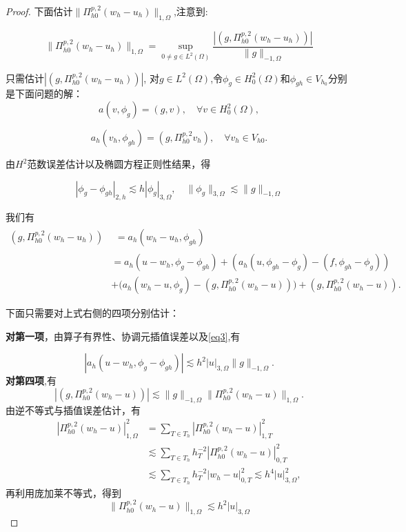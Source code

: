 \documentclass[12pt,a4paper]{article}
\begin{document}
\begin{enumerate}
\begin{proof}
			
			
			下面估计$\|\Pi_{h0}^{p,2}(w_h-u_h)\|_{1,\Omega}$,注意到:
			
			\begin{equation}\label{eq2}
				\|\Pi_{h0}^{p,2}(w_h-u_h)\|_{1,\Omega}=\sup_{0\neq g\in L^2(\Omega)}\frac{|(g,\Pi_{h0}^{p,2}(w_h-u_h))|}{\|g\|_{-1,\Omega}}
			\end{equation}
			
			
			只需估计$|(g,\Pi_{h0}^{p,2}(w_h-u_h))|$, 对$g\in L^2(\Omega)$,令$\phi_g\in H_0^2(\Omega)$和$\phi_{gh}\in V_{h_0}$分别是下面问题的解：
			$$a(v,\phi_g)=(g,v),\quad\forall v\in H_0^2(\Omega),$$
			
			$$a_h(v_h,\phi_{gh})=(g,\Pi_{h0}^{p,2}v_h),\quad\forall v_h\in V_{h0}.$$
			
			
			由$H^2$范数误差估计以及椭圆方程正则性结果，得
			
			\begin{equation}\label{eq3}
				|\phi_g-\phi_{gh}|_{2,h}\lesssim h|\phi_g|_{3,\Omega},\quad\|\phi_g\|_{3,\Omega}\lesssim\|g\|_{-1,\Omega}
			\end{equation}
			
			
			我们有
			$$
			\begin{aligned}
				(g,\Pi_{h0}^{p,2}(w_h-u_h))& \begin{aligned}=a_h(w_h-u_h,\phi_{gh})\end{aligned}  \\
				&=a_h(u-w_h,\phi_g-\phi_{gh})+\left(a_h(u,\phi_{gh}-\phi_g)-(f,\phi_{gh}-\phi_g)\right) \\
				&+\Big(a_h(w_h-u,\phi_g)-(g,\Pi_{h0}^{p,2}(w_h-u))\Big)+(g,\Pi_{h0}^{p,2}(w_h-u)).
			\end{aligned}
			$$
			
			下面只需要对上式右侧的四项分别估计：
			
			\textbf{对第一项}，由算子有界性、协调元插值误差以及\eqref{eq3},有
			
			\begin{equation}\label{eq4}
				|a_h(u-w_h,\phi_g-\phi_{gh})|\lesssim h^2|u|_{3,\Omega}\|g\|_{-1,\Omega}.
			\end{equation}
			\textbf{对第四项},有
			$$|(g,\Pi_{h0}^{p,2}(w_h-u))|\lesssim\|g\|_{-1,\Omega}\|\Pi_{h0}^{p,2}(w_h-u)\|_{1,\Omega}.$$
			由逆不等式与插值误差估计，有
			$$\begin{aligned}|\Pi_{h0}^{p,2}(w_{h}-u)|_{1,\Omega}^{2}&=\sum_{T\in T_{h}}|\Pi_{h0}^{p,2}(w_{h}-u)|_{1,T}^{2}\\&\lesssim\sum_{T\in T_{h}}h_{T}^{-2}|\Pi_{h0}^{p,2}(w_{h}-u)|_{0,T}^{2}\\&\lesssim\sum_{T\in T_{h}}h_{T}^{-2}|w_{h}-u|_{0,T}^{2}\lesssim h^{4}|u|_{3,\Omega}^{2},\end{aligned}$$
			再利用庞加莱不等式，得到
			\begin{equation}\label{eq5}
				\|\Pi_{h0}^{p,2}(w_h-u)\|_{1,\Omega}\lesssim h^2|u|_{3,\Omega}
			\end{equation}
			

\end{proof}
\end{enumerate}
\end{document}
